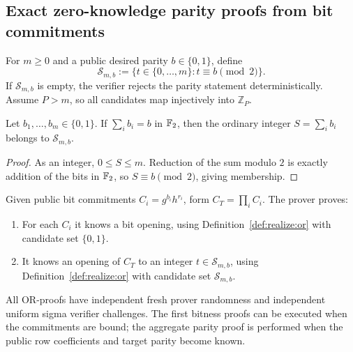 \subsection{Exact zero-knowledge parity proofs from bit commitments}\label{sec:realize:parity}

\begin{definition}\label{def:realize:candidates}
For $m\geq0$ and a public desired parity
$b\in\{0,1\}$, define
\[
 \mathcal S_{m,b}:=\{t\in\{0,\ldots,m\}:t\equiv b
                                  \pmod 2\}.
\]
If $\mathcal S_{m,b}$ is empty, the verifier
rejects the parity statement deterministically.
Assume $P>m$, so all candidates map injectively
into $\mathbb Z_P$.
\end{definition}

\begin{lemma}\label{lem:realize:correct-candidate}
Let $b_1,\ldots,b_m\in\{0,1\}$.
If $\sum_i b_i=b$ in $\mathbb{F}_2$,
then the ordinary integer
$S=\sum_i b_i$ belongs to $\mathcal S_{m,b}$.
\end{lemma}
\begin{proof}
As an integer, $0\leq S\leq m$.
Reduction of the sum modulo $2$
is exactly addition of the bits in $\mathbb{F}_2$,
so $S\equiv b\pmod2$, giving membership.
\end{proof}

\begin{definition}\label{def:realize:parity-proof}
Given public bit commitments
$C_i=g^{b_i}h^{r_i}$, form $C_T=\prod_iC_i$.
The prover proves:
\begin{enumerate}[label=\textup{(\roman*)}]
\item For each $C_i$ it knows a bit opening,
using Definition~\ref{def:realize:or}
with candidate set $\{0,1\}$.
\item It knows an opening of $C_T$ to an
integer $t\in\mathcal S_{m,b}$, using
Definition~\ref{def:realize:or} with
candidate set $\mathcal S_{m,b}$.
\end{enumerate}
All OR-proofs have independent fresh prover
randomness and independent uniform sigma
verifier challenges. The first bitness
proofs can be executed when the commitments
are bound; the aggregate parity proof is
performed when the public row coefficients
and target parity become known.
\end{definition}

